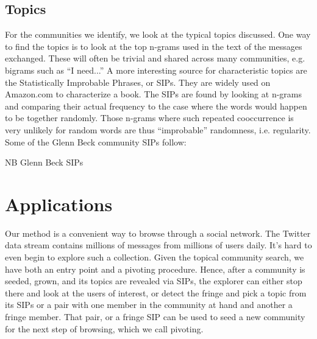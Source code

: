 \subsection{Topics}

For the communities we identify, we look at the typical topics discussed.  One way to find the topics is to look at the top n-grams used in the text of the messages exchanged.  These will often be trivial and shared across many communities, e.g. bigrams such as “I need...”  A more interesting source for characteristic topics are the Statistically Improbable Phrases, or SIPs.  They are widely used on Amazon.com to characterize a book.  The SIPs are found by looking at n-grams and comparing their actual frequency to the case where the words would happen to be together randomly.  Those n-grams where such repeated cooccurrence is very unlikely for random words are thus “improbable” randomness, i.e. regularity.  Some of the Glenn Beck community SIPs follow:

 
NB Glenn Beck SIPs


\section{Applications}

Our method is a convenient way to browse through a social network.  The Twitter data stream contains millions of messages from millions of users daily.  It’s hard to even begin to explore such a collection.  Given the topical community search, we have both an entry point and a pivoting procedure.  Hence, after a community is seeded, grown, and its topics are revealed via SIPs, the explorer can either stop there and look at the users of interest, or detect the fringe and pick a topic from its SIPs or a pair with one member in the community at hand and another a fringe member.  That pair, or a fringe SIP can be used to seed a new community for the next step of browsing, which we call pivoting.
